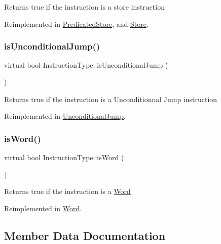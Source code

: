Returns true if the instruction is a store instruction 

Reimplemented in \hyperlink{classPredicatedStore_ada88354c4a4838c8ff5fa7b225f8a751}{Predicated\+Store}, and \hyperlink{classStore_a773c447c4ac4b781ea6d18d91ff3dd50}{Store}.

\mbox{\label{classInstructionType_a145a4e04a4db8a0ecf9e4b35b2403ed3}} 
\subsubsection{\texorpdfstring{is\+Unconditional\+Jump()}{isUnconditionalJump()}}
{\footnotesize\ttfamily virtual bool Instruction\+Type\+::is\+Unconditional\+Jump (\begin{DoxyParamCaption}{ }\end{DoxyParamCaption})\hspace{0.3cm}{\ttfamily [virtual]}}

Returns true if the instruction is a Unconditionnal Jump instruction 

Reimplemented in \hyperlink{classUnconditionalJump_ab4588132d702a35f1dc1102dacba2be5}{Unconditional\+Jump}.

\mbox{\label{classInstructionType_ab4c4569a2cafed0655f95d9a20bd8ea1}} 
\subsubsection{\texorpdfstring{is\+Word()}{isWord()}}
{\footnotesize\ttfamily virtual bool Instruction\+Type\+::is\+Word (\begin{DoxyParamCaption}{ }\end{DoxyParamCaption})\hspace{0.3cm}{\ttfamily [virtual]}}

Returns true if the instruction is a \hyperlink{classWord}{Word} 

Reimplemented in \hyperlink{classWord_a2dde02496b26f4c78881259cb44f70e5}{Word}.



\subsection{Member Data Documentation}
\mbox{\label{classInstructionType_a7dfb488bd47f9168dc5fa1604a18c6c4}} 
